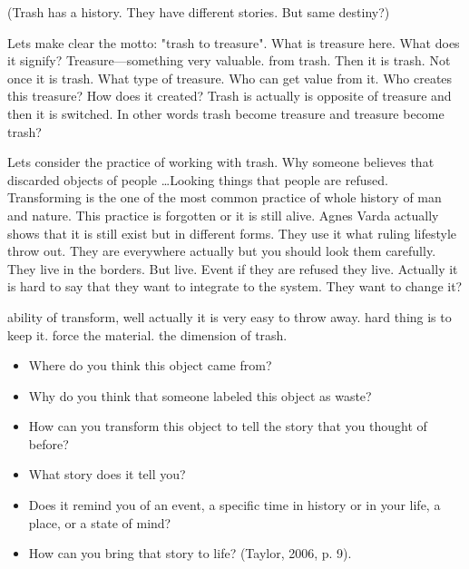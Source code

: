 (Trash has a history. They have different stories. But same destiny?)

Lets make clear the motto: "trash to treasure". What is treasure here. What does it signify? Treasure---something very valuable. from trash. Then it is trash. Not once it is trash. What type of treasure. Who can get value from it. Who creates this treasure? How does it created? Trash is actually is opposite of treasure and then it is switched. In other words trash become treasure and treasure become trash?

Lets consider the practice of working with trash. Why someone believes that discarded objects of people \ldots Looking things that people are refused. Transforming is the one of the most common practice of whole history of man and nature. This practice is forgotten or it is still alive. Agnes Varda actually shows that it is still exist but in different forms. They use it what ruling lifestyle throw out. They are everywhere actually but you should look them carefully. They live in the borders. But live. Event if they are refused they live. Actually it is hard to say that they want to integrate to the system. They want to change it? 

ability of transform, well actually it is very easy to throw away. hard thing is to keep it. force the material. the dimension of trash.



\begin{itemize}
\item Where do you think this object came from?
\item Why do you think that someone labeled this object as waste?
\item How can you transform this object to tell the story that you thought of before?
\item What story does it tell you?
\item Does it remind you of an event, a specific time in history or in your life, a place, or a state of mind?
\item How can you bring that story to life? (Taylor, 2006, p. 9).
\end{itemize}

